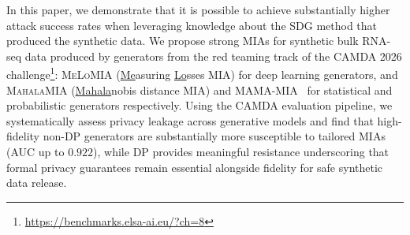\documentclass[11pt]{article}
\newcommand{\martine}[1]{\textcolor{magenta}{Martine: #1}}
\newcommand{\sikha}[1]{\textcolor{blue}{Sikha: #1}}
\begin{document}
In this paper, we demonstrate that it is possible to achieve substantially higher attack success rates when leveraging knowledge about the SDG method that produced the synthetic data.
%
%
We propose strong MIAs for synthetic bulk RNA-seq data produced by generators from the red teaming track of the CAMDA 2026 challenge\footnote{\url{https://benchmarks.elsa-ai.eu/?ch=8}}:
\textsc{MeLoMIA} (\ul{Me}asuring \ul{Lo}sses MIA) for deep learning generators, and \textsc{MahalaMIA} (\ul{Mahala}nobis distance MIA) and \textsc{MAMA-MIA}~\cite{golob2024privacy} for statistical and probabilistic generators respectively.
%
Using the CAMDA evaluation pipeline, we systematically assess privacy leakage across %
generative models and find that high-fidelity non-DP generators are substantially more susceptible to tailored MIAs (AUC up to $0.922$), while DP provides meaningful resistance underscoring that formal privacy guarantees remain essential alongside fidelity for safe synthetic data release.
\end{document}
